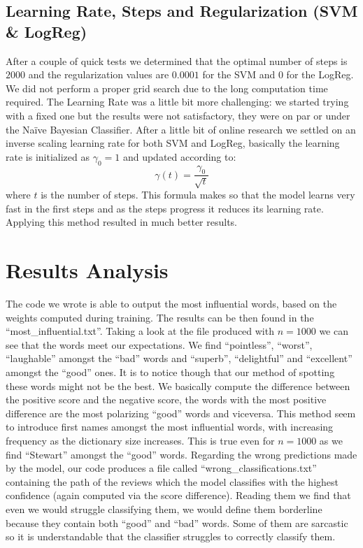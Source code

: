 \documentclass[10pt,a4paper]{report}
\begin{document}
\subsection{Learning Rate, Steps and Regularization (SVM \& LogReg)}
After a couple of quick tests we determined that the optimal number of steps is $2000$ and the regularization values are $0.0001$ for the SVM and $0$ for the LogReg. We did not perform a proper grid search due to the long computation time required. The Learning Rate was a little bit more challenging: we started trying with a fixed one but the results were not satisfactory, they were on par or under the Na\"{i}ve Bayesian Classifier. After a little bit of online research we settled on an inverse scaling learning rate for both SVM and LogReg, basically the learning rate is initialized as $\gamma_0=1$ and updated according to:
\begin{equation}
\gamma(t)=\frac{\gamma_0}{\sqrt{t}}
\end{equation}
where $t$ is the number of steps. This formula makes so that the model learns very fast in the first steps and as the steps progress it reduces its learning rate. Applying this method resulted in much better results. 
\section{Results Analysis}
The code we wrote is able to output the most influential words, based on the weights computed during training. The results can be then found in the \enquote{most\_influential.txt}. Taking a look at the file produced with $n=1000$ we can see that the words meet our expectations. We find \enquote{pointless}, \enquote{worst}, \enquote{laughable} amongst the \enquote{bad} words and \enquote{superb}, \enquote{delightful} and \enquote{excellent} amongst the \enquote{good} ones. It is to notice though that our method of spotting these words might not be the best. We basically compute the difference between the positive score and the negative score, the words with the most positive difference are the most polarizing \enquote{good} words and viceversa. This method seem to introduce first names amongst the most influential words, with increasing frequency as the dictionary size increases. This is true even for $n=1000$ as we find \enquote{Stewart} amongst the \enquote{good} words. Regarding the wrong predictions made by the model, our code produces a file called \enquote{wrong\_classifications.txt} containing the path of the reviews which the model classifies with the highest confidence (again computed via the score difference). Reading them we find that even we would struggle classifying them, we would define them borderline because they contain both \enquote{good} and \enquote{bad} words. Some of them are sarcastic so it is understandable that the classifier struggles to correctly classify them.
\end{document}
